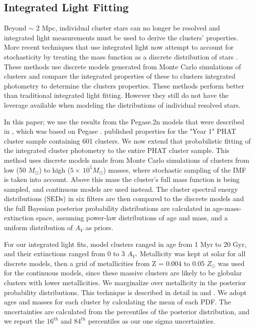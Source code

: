 \documentclass{emulateapj}
\begin{document}
\subsection{Integrated Light Fitting}\label{sec:intlight}
Beyond $\sim$ 2 Mpc, individual cluster stars can no longer be resolved and integrated light measurements must be used to derive the clusters' properties.  More recent techniques that use integrated light now attempt to account for stochasticity by treating the mass function as a discrete distribution of stars \citep{Fouesneau10, Popescu10a, Deveikis08, daSilva12}.  These methods use discrete models generated from Monte Carlo simulations of clusters and compare the integrated properties of these to clusters integrated photometry to determine the clusters properties.  These methods perform better than traditional integrated light fitting.  However they still do not have the leverage available when modeling the distributions of individual resolved stars.

In this paper; we use the results from the Pegase.2n models that were described in \cite{Fouesneau14}, which was based on Pegase \citep{Fioc97}.  \cite{Fouesneau14} published properties for the \cite{Johnson12} "Year 1" PHAT cluster sample containing 601 clusters.  We now extend that probabilistic fitting of the integrated cluster photometry to the entire PHAT cluster sample.  This method uses discrete models made from Monte Carlo simulations of clusters from low (50 $M_{\odot}$) to high ($5 \times\ 10^{5} M_{\odot}$) masses, where stochastic sampling of the IMF is taken into account.  Above this mass the cluster's full mass function is being sampled, and continuous models are used instead.  The cluster spectral energy distributions (SEDs) in six filters are then compared to the discrete models and the full Bayesian posterior probability distributions are calculated in age-mass-extinction space, assuming power-law distributions of age and mass, and a uniform distribution of $A_{V}$ as priors.  

For our integrated light fits, model clusters ranged in age from 1 Myr to 20 Gyr, and their extinctions ranged from 0 to 3 $A_V$.  Metallicity was kept at solar for all discrete models, then a grid of metallicities from Z = 0.004 to 0.05 $Z_{\odot}$ was used for the continuous models, since these massive clusters are likely to be globular clusters with lower metallicities.  We marginalize over metallicity in the posterior probability distributions.  This technique is described in detail in \cite{Fouesneau10} and \cite{Fouesneau14}.  We adopt ages and masses for each cluster by calculating the mean of each PDF.  The uncertainties are calculated from the percentiles of the posterior distribution, and we report the $16^{th}$ and $84^{th}$ percentiles as our one sigma uncertainties. 
\end{document}
